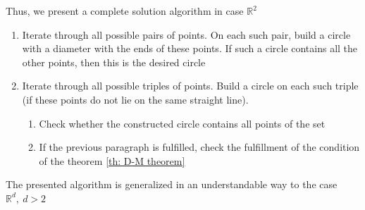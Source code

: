 \documentclass[a4paper, 12pt]{article}
\def\RR{\mathbb{R}}
\theoremstyle{plain} %
\theoremstyle{definition} %
\theoremstyle{remark} %
\begin{document}
Thus, we present a complete solution algorithm in case $\RR^2$
\begin{enumerate}
\item Iterate through all possible pairs of points. On each such pair, build a circle with a diameter with the ends of these points. If such a circle contains all the other points, then this is the desired circle
\item Iterate through all possible triples of points. Build a circle on each such triple (if these points do not lie on the same straight line).
\begin{enumerate}
\item Check whether the constructed circle contains all points of the set
\item If the previous paragraph is fulfilled, check the fulfillment of the condition of the theorem \ref{th: D-M theorem}
\end{enumerate} 
\end{enumerate}

The presented algorithm is generalized in an understandable way to the case $\RR^d, ~ d > 2$
\end{document}
